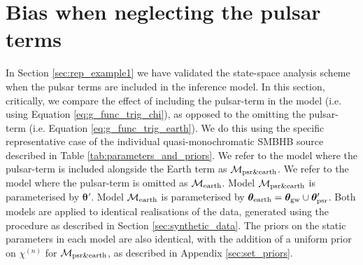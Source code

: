 \documentclass[fleqn,usenatbib,useAMS]{mnras}
\begin{document}





%







%

\section{Bias when neglecting the pulsar terms}\label{sec:earth_vs_psr}
In Section \ref{sec:rep_example1} we have validated the state-space analysis scheme when the pulsar terms are included in the inference model. In this section, critically, we compare the effect of including the pulsar-term in the model (i.e. using Equation \eqref{eq:g_func_trig_chi}), as opposed to the omitting the pulsar-term (i.e. Equation \eqref{eq:g_func_trig_earth}). We do this using the specific representative case of the individual quasi-monochromatic SMBHB source described in Table \ref{tab:parameters_and_priors}. We refer to the model where the pulsar-term is included alongside the Earth term as $\mathcal{M}_{\rm psr \& earth}$. We refer to the model where the pulsar-term is omitted as 
$\mathcal{M}_{\rm earth}$. Model $\mathcal{M}_{\rm psr \& earth}$ is parameterised by $\boldsymbol{\theta}'$. Model $\mathcal{M}_{\rm earth}$ is parameterised by $\boldsymbol{\theta}_{\rm earth} = \boldsymbol{\theta}_{\rm gw} \cup \boldsymbol{\theta}'_{\rm psr}$. Both models are applied to identical realisations of the data, generated using the procedure as described in Section  \ref{sec:synthetic_data}. The priors on the static parameters in each model are also identical, with the addition of a uniform prior on $\chi^{(n)}$ for $\mathcal{M}_{\rm psr \& earth}$, as described in Appendix \ref{sec:set_priors}. \newline 
\end{document}
